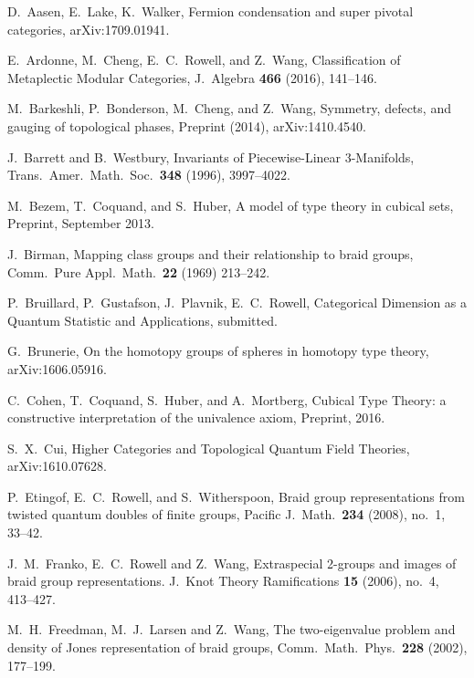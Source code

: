 \documentclass[12pt]{article}
\theoremstyle{plain} \numberwithin{equation}{section}
\theoremstyle{definition}
\begin{document}
\begin{thebibliography}{0}

   D.\ Aasen, E.\ Lake, K.\ Walker, Fermion condensation and super pivotal categories, arXiv:1709.01941.
  
   E.\ Ardonne, M.\ Cheng, E.\ C.\ Rowell, and Z.\ Wang, {Classification of Metaplectic Modular Categories}, J.\ Algebra \textbf{466} (2016), 141--146.

   M.\ Barkeshli, P.\ Bonderson, M.\ Cheng, and Z.\ Wang, {Symmetry, defects, and gauging of topological phases}, Preprint (2014), arXiv:1410.4540.
  
   J.\ Barrett and B.\ Westbury, {Invariants
    of Piecewise-Linear 3-Manifolds}, Trans.\ Amer.\ Math.\ Soc.\ \textbf{348} (1996), 3997--4022.

   M.\ Bezem, T.\ Coquand, and S.\ Huber, A model of type theory in cubical sets, Preprint, September 2013.

   J.\ Birman, {Mapping class groups and their relationship to braid groups}, Comm.\ Pure Appl.\ Math.\ \textbf{22} (1969) 213--242.


     P.\ Bruillard, P.\ Gustafson, J.\ Plavnik, E.\ C.\ Rowell, Categorical Dimension as a Quantum Statistic and Applications, submitted.
    
   G.\ Brunerie, On the homotopy groups of spheres in homotopy type theory, arXiv:1606.05916.
    
   C.\ Cohen, T.\ Coquand, S.\ Huber, and A.\ Mortberg, Cubical Type Theory: a constructive interpretation of the univalence axiom, Preprint, 2016.

   S.\ X.\ Cui, Higher Categories and Topological Quantum Field Theories, arXiv:1610.07628.
    
   P.\ Etingof, E.\ C.\ Rowell, and S.\ Witherspoon, {Braid group representations from twisted quantum doubles of finite groups}, Pacific J.\ Math.\ \textbf{234} (2008), no.\ 1, 33--42.

     J.\ M.\ Franko, E.\ C.\ Rowell and Z.\ Wang, {Extraspecial 2-groups and images of braid group representations.}  J.\ Knot Theory Ramifications \textbf{15} (2006),  no.\ 4, 413--427.
    
          M.\ H.\ Freedman, M.\ J.\ Larsen and Z.\ Wang, {The two-eigenvalue problem and density of Jones representation of braid groups}, Comm.\ Math.\ Phys.\ \textbf{228} (2002), 177--199.


\end{thebibliography}
\end{document}
